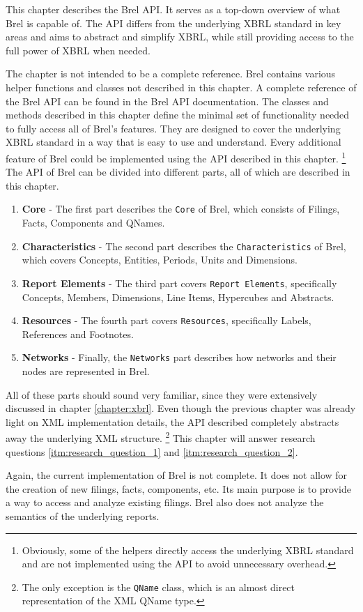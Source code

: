 This chapter describes the Brel API.
It serves as a top-down overview of what Brel is capable of.
The API differs from the underlying XBRL standard in key areas and aims to abstract and simplify XBRL,
while still providing access to the full power of XBRL when needed.

The chapter is not intended to be a complete reference.
Brel contains various helper functions and classes not described in this chapter.
A complete reference of the Brel API can be found in the Brel API documentation\cite{brel_api}.
The classes and methods described in this chapter define the minimal set of functionality needed to fully access all of Brel's features.
They are designed to cover the underlying XBRL standard in a way that is easy to use and understand.
Every additional feature of Brel could be implemented using the API described in this chapter.
\footnote{Obviously, some of the helpers directly access the underlying XBRL standard and are not implemented using the API to avoid unnecessary overhead.}
The API of Brel can be divided into different parts, all of which are described in this chapter.

\begin{enumerate}
    \item \textbf{Core} - The first part describes the \texttt{Core} of Brel, which consists of Filings, Facts, Components and QNames.
    \item \textbf{Characteristics} - The second part describes the \texttt{Characteristics} of Brel, which covers Concepts, Entities, Periods, Units and Dimensions.
    \item \textbf{Report Elements} - The third part covers \texttt{Report Elements}, specifically Concepts, Members, Dimensions, Line Items, Hypercubes and Abstracts.
    \item \textbf{Resources} - The fourth part covers \texttt{Resources}, specifically Labels, References and Footnotes.
    \item \textbf{Networks} - Finally, the \texttt{Networks} part describes how networks and their nodes are represented in Brel.
\end{enumerate}

All of these parts should sound very familiar, since they were extensively discussed in chapter \ref{chapter:xbrl}.
Even though the previous chapter was already light on XML implementation details, 
the API described completely abstracts away the underlying XML structure.
\footnote{The only exception is the \texttt{QName} class, which is an almost direct representation of the XML QName type.}
This chapter will answer research questions \ref{itm:research_question_1} and \ref{itm:research_question_2}.

Again, the current implementation of Brel is not complete.
It does not allow for the creation of new filings, facts, components, etc.
Its main purpose is to provide a way to access and analyze existing filings.
Brel also does not analyze the semantics of the underlying reports.

